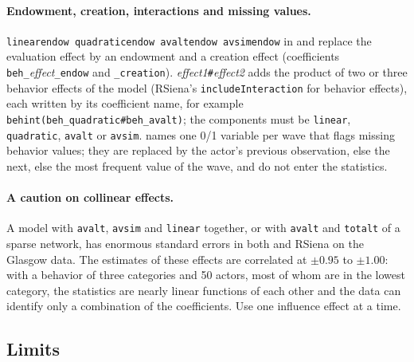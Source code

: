 \paragraph{Endowment, creation, interactions and missing values.} \texttt{linearendow quadraticendow avaltendow avsimendow} in  and  replace the evaluation effect by an endowment and a creation effect (coefficients \texttt{beh\_}\emph{effect}\texttt{\_endow} and \texttt{\_creation}). \emph{effect1}\texttt{\#}\emph{effect2}\opt{)} adds the product of two or three behavior effects of the model (RSiena's \texttt{includeInteraction} for behavior effects), each written by its coefficient name, for example \texttt{behint(beh\_quadratic\#beh\_avalt)}; the components must be \texttt{linear}, \texttt{quadratic}, \texttt{avalt} or \texttt{avsim}.  names one 0/1 variable per wave that flags missing behavior values; they are replaced by the actor's previous observation, else the next, else the most frequent value of the wave, and do not enter the statistics.

\paragraph{A caution on collinear effects.} A model with \texttt{avalt}, \texttt{avsim} and \texttt{linear} together, or with \texttt{avalt} and \texttt{totalt} of a sparse network, has enormous standard errors in both \nwsaom{} and RSiena on the Glasgow data. The estimates of these effects are correlated at $\pm0.95$ to $\pm1.00$: with a behavior of three categories and 50 actors, most of whom are in the lowest category, the statistics are nearly linear functions of each other and the data can identify only a combination of the coefficients. Use one influence effect at a time.

\subsection{Limits}\label{sec:mn-limits}

